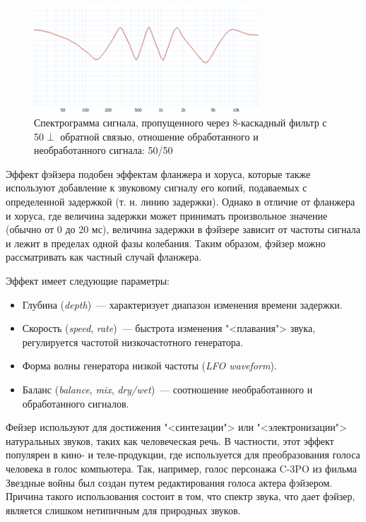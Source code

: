 \documentclass[oneside, final, 14pt]{extreport}
\begin{document}
\begin{figure}[h!]
  \centering
  \includegraphics[width=0.75\textwidth]{pic-phaser-02}
  \caption{Спектрограмма сигнала, пропущенного через 8-каскадный фильтр с 50$\perp$ обратной связью, отношение обработанного и необработанного сигнала: 50/50}
  \label{pic-phaser-02}
\end{figure}

Эффект фэйзера подобен эффектам фланжера и хоруса, которые также используют добавление к звуковому сигналу его копий, подаваемых с определенной задержкой (т. н. линию задержки). Однако в отличие от фланжера и хоруса, где величина задержки может принимать произвольное значение (обычно от 0 до 20 мс), величина задержки в фэйзере зависит от частоты сигнала и лежит в пределах одной фазы колебания. Таким образом, фэйзер можно рассматривать как частный случай фланжера.

Эффект имеет следующие параметры:
\begin{itemize}
  \item Глубина (\textit{depth})~--- характеризует диапазон изменения времени задержки.
  \item Скорость (\textit{speed}, \textit{rate})~--- быстрота изменения "<плавания"> звука, регулируется частотой низкочастотного генератора.
  \item Форма волны генератора низкой частоты (\textit{LFO waveform}).
  \item Баланс (\textit{balance}, \textit{mix}, \textit{dry/wet})~--- соотношение необработанного и обработанного сигналов.
\end{itemize}

Фейзер используют для достижения "<синтезации"> или "<электронизации"> натуральных звуков, таких как человеческая речь. В частности, этот эффект популярен в кино- и теле-продукции, где используется для преобразования голоса человека в голос компьютера. Так, например, голос персонажа C-3PO из фильма Звездные войны был создан путем редактирования голоса актера фэйзером. Причина такого использования состоит в том, что спектр звука, что дает фэйзер, является слишком нетипичным для природных звуков.
\end{document}
